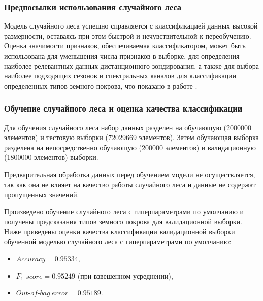 \documentclass[14pt, a4paper, oneside]{extarticle}
\begin{document}
\subsubsection{Предпосылки использования случайного леса}
Модель случайного леса успешно справляется с классификацией данных высокой размерности, оставаясь при этом быстрой и нечувствительной к переобучению. Оценка значимости признаков, обеспечиваемая классификатором, может быть использована для уменьшения числа признаков в выборке, для определения наиболее релевантных данных дистанционного зондирования, а также для выбора наиболее подходящих сезонов и спектральных каналов для классификации определенных типов земного покрова, что показано в работе \cite{random-forest-in-remote-sensing}.

\subsubsection{Обучение случайного леса и оценка качества классификации}
Для обучения случайного леса набор данных разделен на обучающую (2000000 элементов) и тестовую выборки (72029669 элементов). Затем обучающая выборка разделена на непосредственно обучающую (200000 элементов) и валидационную (1800000 элементов) выборки.

Предварительная обработка данных перед обучением модели не осуществляется, так как она не влияет на качество работы случайного леса и данные не содержат пропущенных значений.

Произведено обучение случайного леса с гиперпараметрами по умолчанию и получены предсказания типов земного покрова для валидационной выборки. Ниже приведены оценки качества классификации валидационной выборки обученной моделью случайного леса с гиперпараметрами по умолчанию:
\begin{itemize}
    \item[] $Accuracy = 0.95334,$
    \item[] $F_1\mbox{-}score = 0.95249$ (при взвешенном усреднении),
    \item[] $Out\mbox{-}of\mbox{-}bag\ error = 0.95189.$
\end{itemize}
\end{document}
